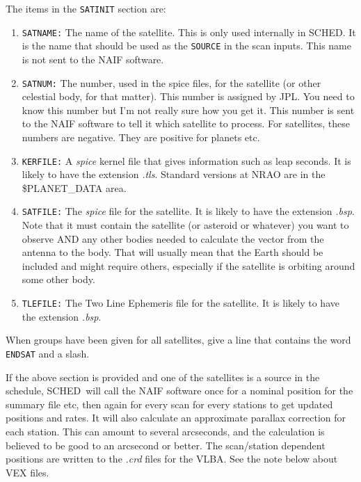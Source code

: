 \documentclass{report}
\newcommand{\sched}{{\sc SCHED}}
\newcommand{\schedb}{{\sc SCHED~}}
\begin{document}
The items in the {\tt SATINIT} section are:

\begin{enumerate}

\item {\tt SATNAME:} The name of the satellite.  This is only used internally
in \sched.  It is the name that should be used as the {\tt SOURCE} in
the scan inputs.  This name is not sent to the NAIF software.

\item {\tt SATNUM:} The number, used in the spice files, for the satellite (or
other celestial body, for that matter).  This number is assigned by JPL.
You need to know this number but I'm not really sure how you get it.
This number is sent to the NAIF software to tell it which satellite to
process.  For satellites, these numbers are negative.  They are positive
for planets etc.

\item {\tt KERFILE:} A {\sl spice} kernel file that gives information such
as leap seconds.  It is likely to have the extension {\sl .tls}.  Standard
versions at NRAO are in the \$PLANET\_DATA area.

\item {\tt SATFILE:} The {\sl spice} file for the satellite.  It is likely
to have the extension {\sl .bsp}.  Note that it must contain the satellite
(or asteroid or whatever) you want to observe AND any other bodies needed
to calculate the vector from the antenna to the body.  That will usually
mean that the Earth should be included and might require others, especially
if the satellite is orbiting around some other body.

\item {\tt TLEFILE:} The Two Line Ephemeris file for the satellite.
It is likely to have the extension {\sl .bsp}.

\end{enumerate}

When groups have been given for all satellites, give a line that
contains the word {\tt ENDSAT} and a slash.

If the above section is provided and one of the satellites is a source
in the schedule, \schedb will call the NAIF software once for a
nominal position for the summary file etc, then again for every scan
for every stations to get updated positions and rates.  It will also
calculate an approximate parallax correction for each station.  This
can amount to several arcseconds, and the calculation is believed to
be good to an arcsecond or better.  The scan/station dependent positions
are written to the {\sl .crd} files for the VLBA.  See the note below
about VEX files.
\end{document}

